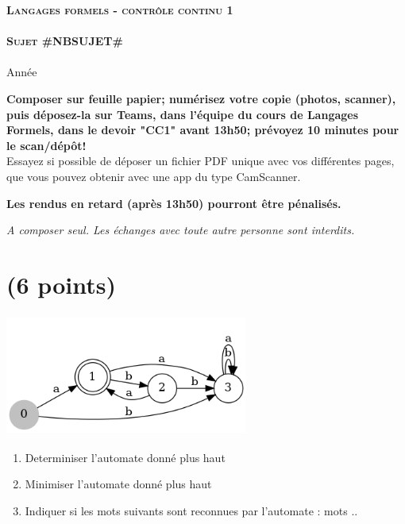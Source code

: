 \documentclass[]{article}
\begin{document}
    \begin{center}
    {\Large \textbf{\textsc{Langages formels - contrôle continu 1}}}
        \\
        ~\\
        {\Huge \textbf{\textsc{Sujet #NBSUJET#}}}\\
        ~\\
        Année \the\year
    \end{center}

    \vskip 5mm
    \textbf{Composer sur feuille papier; numérisez votre copie (photos, scanner), puis déposez-la sur Teams, dans l'équipe du cours de Langages Formels, dans le devoir "CC1" avant 13h50; prévoyez 10 minutes pour le scan/dépôt!} \\

    Essayez si possible de déposer un fichier PDF unique avec vos différentes pages, que vous pouvez obtenir avec une app du type CamScanner.


    \textbf{Les rendus en retard (après 13h50) pourront être pénalisés.}


    \emph{A composer seul. Les échanges avec toute autre personne sont interdits.}\\


    \section{(6 points)}
    \begin{center}
        \includegraphics [width=8cm, height=4cm,center]{automateInitial.png}
    \end{center}

    \begin{enumerate}
        \item  Determiniser l'automate donné plus haut

        \item Minimiser l'automate donné plus haut

        \item Indiquer si les mots suivants sont reconnues par l'automate : {mots ..}

    \end{enumerate}
\end{document}
